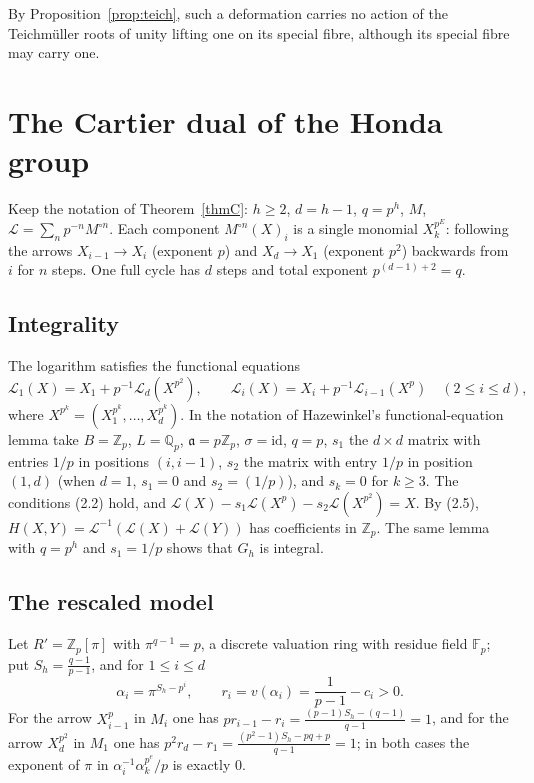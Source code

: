 \documentclass[11pt]{amsart}
\theoremstyle{definition}
\theoremstyle{remark}
\newcommand{\Z}{\mathbb Z}
\newcommand{\Q}{\mathbb Q}
\newcommand{\F}{\mathbb F}
\begin{document}
By Proposition~\ref{prop:teich}, such a deformation carries no action of the Teichm\"uller roots of unity lifting one on its special fibre, although its special fibre may carry one.

\section{The Cartier dual of the Honda group}\label{sec:dual}

Keep the notation of Theorem~\ref{thmC}: $h\ge2$, $d=h-1$, $q=p^h$, $M$, $\mathcal L=\sum_np^{-n}M^{\circ n}$. Each component $M^{\circ n}(X)_i$ is a single monomial $X_k^{p^E}$: following the arrows $X_{i-1}\to X_i$ (exponent $p$) and $X_d\to X_1$ (exponent $p^2$) backwards from $i$ for $n$ steps. One full cycle has $d$ steps and total exponent $p^{(d-1)+2}=q$.

\subsection{Integrality}
The logarithm satisfies the functional equations
\[
 \mathcal L_1(X)=X_1+p^{-1}\mathcal L_d(X^{p^2}),\qquad \mathcal L_i(X)=X_i+p^{-1}\mathcal L_{i-1}(X^p)\quad(2\le i\le d),
\]
where $X^{p^k}=(X_1^{p^k},\dots,X_d^{p^k})$. In the notation of Hazewinkel's functional-equation lemma \cite[2.1--2.3, pp.~73--74]{Hazewinkel79} take $B=\Z_p$, $L=\Q_p$, $\mathfrak a=p\Z_p$, $\sigma=\mathrm{id}$, $q=p$, $s_1$ the $d\times d$ matrix with entries $1/p$ in positions $(i,i-1)$, $s_2$ the matrix with entry $1/p$ in position $(1,d)$ (when $d=1$, $s_1=0$ and $s_2=(1/p)$), and $s_k=0$ for $k\ge3$. The conditions (2.2) hold, and $\mathcal L(X)-s_1\mathcal L(X^p)-s_2\mathcal L(X^{p^2})=X$. By (2.5), $H(X,Y)=\mathcal L^{-1}(\mathcal L(X)+\mathcal L(Y))$ has coefficients in $\Z_p$. The same lemma with $q=p^h$ and $s_1=1/p$ shows that $G_h$ is integral.

\subsection{The rescaled model}
Let $R'=\Z_p[\pi]$ with $\pi^{q-1}=p$, a discrete valuation ring with residue field $\F_p$; put $S_h=\frac{q-1}{p-1}$, and for $1\le i\le d$
\[
 \alpha_i=\pi^{S_h-p^i},\qquad r_i=v(\alpha_i)=\frac1{p-1}-c_i>0 .
\]
For the arrow $X_{i-1}^p$ in $M_i$ one has $pr_{i-1}-r_i=\frac{(p-1)S_h-(q-1)}{q-1}=1$, and for the arrow $X_d^{p^2}$ in $M_1$ one has $p^2r_d-r_1=\frac{(p^2-1)S_h-pq+p}{q-1}=1$; in both cases the exponent of $\pi$ in $\alpha_i^{-1}\alpha_k^{p^e}/p$ is exactly $0$.
\end{document}
